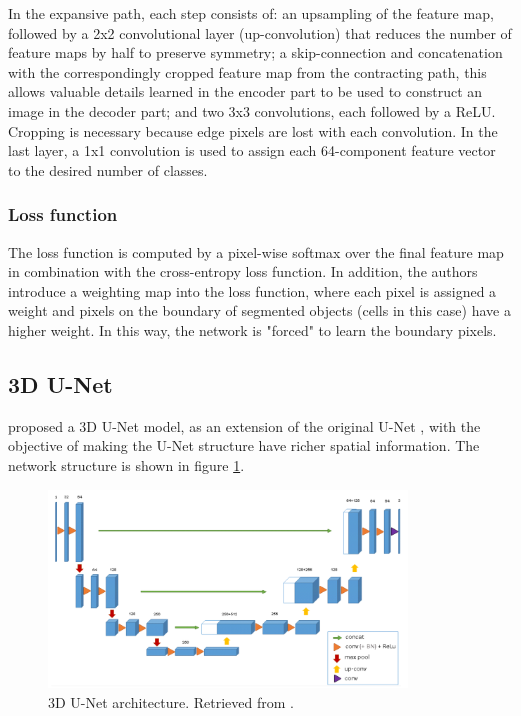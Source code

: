 In the expansive path, each step consists of: an upsampling of the feature map, followed by a 2x2 convolutional layer (up-convolution) that reduces the number of feature maps by half to preserve symmetry; a skip-connection and concatenation with the correspondingly cropped feature map from the contracting path, this allows valuable details learned in the encoder part to be used to construct an image in the decoder part; and two 3x3 convolutions, each followed by a \ac{ReLU}. Cropping is necessary because edge pixels are lost with each convolution. In the last layer, a 1x1 convolution is used to assign each 64-component feature vector to the desired number of classes.


\subsubsection*{Loss function}

The loss function is computed by a pixel-wise softmax over the final feature map in combination with the cross-entropy loss function. In addition, the authors introduce a weighting map into the loss function, where each pixel is assigned a weight and pixels on the boundary of segmented objects (cells in this case) have a higher weight. In this way, the network is "forced" to learn the boundary pixels.

\subsection{3D U-Net}
\label{subsection:3dunet}

\citet{Unet:3D} proposed a \ac{3D} U-Net model, as an extension of the original U-Net \cite{Unet:2D}, with the objective of making the U-Net structure have richer spatial information. The network structure is shown in figure \ref{fig:3dUnet}. 

\begin{figure}[!htb]
  \centering
  \includegraphics[width=0.85\textwidth]{Images/3dunet.jpg}
  \caption[\ac{3D} U-Net architecture.]{\ac{3D} U-Net architecture. Retrieved from \cite{Unet:3D}.}
  \label{fig:3dUnet}
\end{figure}

